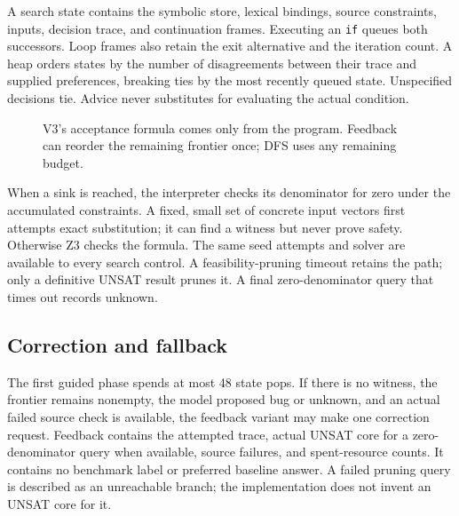 \documentclass[sigconf]{acmart}
\begin{document}
A search state contains the symbolic store, lexical bindings, source
constraints, inputs, decision trace, and continuation frames. Executing an
\texttt{if} queues both successors. Loop frames also retain the exit
alternative and the iteration count. A heap orders states by the number of
disagreements between their trace and supplied preferences, breaking ties
by the most recently queued state. Unspecified decisions tie. Advice never
substitutes for evaluating the actual condition.

\begin{figure}[t]
\centering
{}
\caption{V3's acceptance formula comes only from the program. Feedback can
reorder the remaining frontier once; DFS uses any remaining budget.}
\label{fig:workflow}
\end{figure}

When a sink is reached, the interpreter checks its denominator for zero
under the accumulated constraints. A fixed, small set of concrete input
vectors first attempts exact substitution; it can find a witness but never
prove safety. Otherwise Z3 checks the formula. The same seed attempts and
solver are available to every search control. A feasibility-pruning timeout
retains the path; only a definitive UNSAT result prunes it. A final
zero-denominator query that times out records unknown.

\subsection{Correction and fallback}
The first guided phase spends at most 48 state pops. If there is no witness,
the frontier remains nonempty, the model proposed bug or unknown, and an
actual failed source check is available, the feedback variant may make
one correction request. Feedback contains the attempted trace, actual
UNSAT core for a zero-denominator query when available, source failures,
and spent-resource counts. It contains no benchmark label or preferred
baseline answer. A failed pruning query is described as an unreachable
branch; the implementation does not invent an UNSAT core for it.
\end{document}
